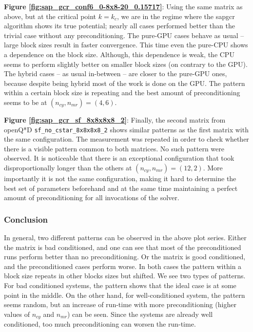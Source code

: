 \documentclass{article}
\theoremstyle{plain} %
\theoremstyle{convention} %
\theoremstyle{remark} %
\def\code#1{\texttt{#1}}
\numberwithin{equation}{section}
\begin{document}
\textbf{Figure \ref{fig:sap_gcr_conf6_0-8x8-20_0.15717}}: Using the same matrix as above, but at the critical point $k=k_c$, we are in the regime where the \acrshort{sapgcr} algorithm shows its true potential; nearly all cases performed better than the trivial case without any preconditioning. The pure-GPU cases behave as usual -- large block sizes result in faster convergence. This time even the pure-CPU shows a dependence on the block size. Although, this dependence is weak, the CPU seems to perform slightly better on smaller block sizes (on contrary to the GPU). The hybrid cases -- as usual in-between -- are closer to the pure-GPU ones, because despite being hybrid most of the work is done on the GPU. The pattern within a certain block size is repeating and the best amount of preconditioning seems to be at $(n_{cy}, n_{mr}) = (4,6)$.

\textbf{Figure \ref{fig:sap_gcr_sf_8x8x8x8_2}}: Finally, the second matrix from openQ*D \code{sf\_no\_cstar\_8x8x8x8\_2} shows similar patterns as the first matrix with the same configuration. The measurement was repeated in order to check whether there is a visible pattern common to both matrices. No such pattern were observed. It is noticeable that there is an exceptional configuration that took disproportionally longer than the others at $(n_{cy}, n_{mr}) = (12,2)$. More importantly it is not the same configuration, making it hard to determine the best set of parameters beforehand and at the same time maintaining a perfect amount of preconditioning for all invocations of the solver.


\subsubsection{Conclusion}

In general, two different patterns can be observed in the above plot series. Either the matrix is bad conditioned, and one can see that most of the preconditioned runs perform better than no preconditioning. Or the matrix is good conditioned, and the preconditioned cases perform worse. In both cases the pattern within a block size repeats in other blocks sizes but shifted. We see two types of patterns. For bad conditioned systems, the pattern shows that the ideal case is at some point in the middle. On the other hand, for well-conditioned system, the pattern seems random, but an increase of run-time with more preconditioning (higher values of $n_{cy}$ and $n_{mr}$) can be seen. Since the systems are already well conditioned, too much preconditioning can worsen the run-time.
\end{document}

